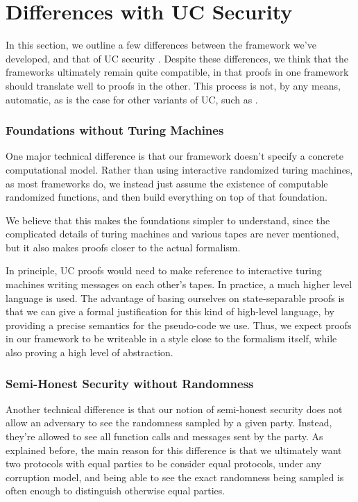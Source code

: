 \section{Differences with UC Security}

In this section, we outline a few differences between
the framework we've developed, and that of UC security
\cite{EPRINT:Canetti00}.
Despite these differences, we think that the frameworks
ultimately remain quite compatible, 
in that proofs in one framework should translate well
to proofs in the other.
This process is not, by any means, automatic,
as is the case for other variants of UC,
such as \cite{C:CanCohLin15}.

\subsubsection*{Foundations without Turing Machines}

One major technical difference is that our framework
doesn't specify a concrete computational model.
Rather than using interactive randomized turing machines,
as most frameworks do, we instead just
assume the existence of computable randomized functions,
and then build everything on top of that foundation.

We believe that this makes the foundations simpler to understand,
since the complicated details of turing machines and various
tapes are never mentioned, but it also
makes proofs closer to the actual formalism.

In principle, UC proofs would need to make reference
to interactive turing machines writing messages on each other's
tapes.
In practice, a much higher level language is used.
The advantage of basing ourselves on state-separable proofs
is that we can give a formal justification for this kind
of high-level language, by providing a precise semantics
for the pseudo-code we use.
Thus, we expect proofs in our framework to be writeable
in a style close to the formalism itself,
while also proving a high level of abstraction.

\subsubsection*{Semi-Honest Security without Randomness}

Another technical difference is that our notion of semi-honest
security does not allow an adversary to see the randomness
sampled by a given party.
Instead, they're allowed to see all function calls
and messages sent by the party.
As explained before, the main reason for this difference
is that we ultimately want two protocols
with equal parties to be consider equal protocols,
under any corruption model, and being able to see the
exact randomness being sampled is often enough to distinguish
otherwise equal parties.

